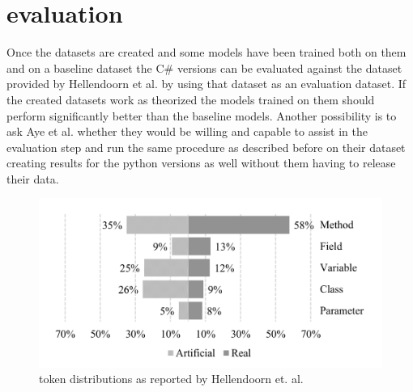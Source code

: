 \documentclass[sigplan,screen,9pt]{acmart}
\begin{document}
\section{evaluation}
Once the datasets are created and some models have been trained both on them and on a baseline dataset the C\# versions can be evaluated against the dataset provided by Hellendoorn et al.\cite{8812116} by using that dataset as an evaluation dataset.
If the created datasets work as theorized the models trained on them should perform significantly better than the baseline models.
Another possibility is to ask Aye et al. whether they would be willing and capable to assist in the evaluation step and run the same procedure as described before on their dataset creating results for the python versions as well without them having to release their data.







\begin{figure}
    \centering
    \includegraphics[scale = 0.1]{token-distribution.png}
    \caption{token distributions as reported by Hellendoorn et. al.\cite{8812116}}
    \label{fig:distributions}
\end{figure}







\end{document}
